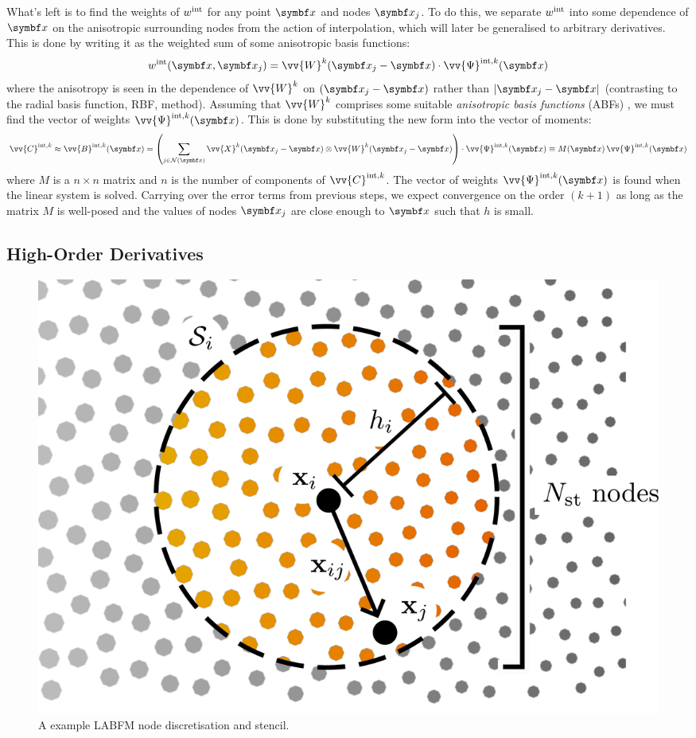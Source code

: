 What's left is to find the weights of $w^{\rm{int}}$ for any point $\vb{x}$ and nodes $\vb{x}_j$. To do this, we separate $w^{\rm{int}}$ into some dependence of $\vb{x}$ on the anisotropic surrounding nodes from the action of interpolation, which will later be generalised to arbitrary derivatives. This is done by writing it as the weighted sum of some anisotropic basis functions:
\begin{equation}
w^{\rm{int}}(\vb{x}, \vb{x}_j) = \vv{W}^k(\vb{x}_j - \vb{x}) \cdot \vv{\Psi}^{\rm{int}, k}(\vb{x})
\end{equation}
where the anisotropy is seen in the dependence of $\vv{W}^k$ on $(\vb{x}_j - \vb{x})$ rather than $|\vb{x}_j - \vb{x}|$ (contrasting to the radial basis function, RBF, method). Assuming that $\vv{W}^k$ comprises some suitable \emph{anisotropic basis functions} (ABFs) \cite{king2022HighOrderSimulationsIsothermal}, we must find the vector of weights $\vv{\Psi}^{\rm{int}, k}(\vb{x})$. This is done by substituting the new form into the vector of moments:
\begin{align}
\vv{C}^{\rm{int}, k}
\approx \vv{B}^{\rm{int}, k}(\vb{x})
= \left( \sum_{j \in \cl{N}(\vb{x})} \vv{X}^k (\vb{x}_j - \vb{x}) \otimes \vv{W}^k(\vb{x}_j - \vb{x}) \right) \cdot \vv{\Psi}^{\rm{int}, k}(\vb{x})
\equiv M(\vb{x}) \, \vv{\Psi}^{\rm{int}, k}(\vb{x})
\end{align}
where $M$ is a $n \times n$ matrix and $n$ is the number of components of $\vv{C}^{\rm{int}, k}$. The vector of weights $\vv{\Psi}^{\rm{int}, k}(\vb{x})$ is found when the linear system is solved. Carrying over the error terms from previous steps, we expect convergence on the order $(k + 1)$ as long as the matrix $M$ is well-posed and the values of nodes $\vb{x}_j$ are close enough to $\vb{x}$ such that $h$ is small.


\subsection{High-Order Derivatives}

\begin{figure}[t]
\centering
\includegraphics[scale=0.25]{assets/imgs/labfm-stencil-drawn_simple.pdf}
\caption{A example LABFM node discretisation and stencil.}
\label{fig:labfm-stencil}
\end{figure}

